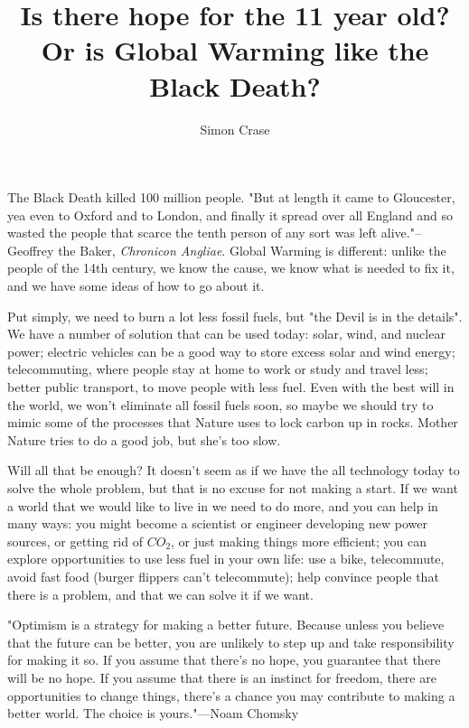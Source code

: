 \documentclass[]{article}
\title{Is there hope for the 11 year old? \\Or is Global Warming like the Black Death?}
\author{Simon Crase}
\begin{document}
\maketitle
The Black Death killed 100 million people. "But at length it came to Gloucester, yea even to Oxford and to London, and finally it spread over all England and so wasted the people that scarce the tenth person of any sort was left alive."--Geoffrey the Baker, \textit{Chronicon Angliae}. Global Warming is different: unlike the people of the 14th century, we know the cause, we know what is needed to fix it, and we have some ideas of how to go about it.


Put simply, we need to burn a lot less fossil fuels, but "the Devil is in the details". We have a number of solution that can be used today: solar, wind, and nuclear power; electric vehicles can be a good way to store excess solar and wind energy; telecommuting, where people stay at home to work or study and travel less; better public transport, to move people with less fuel. Even with the best will in the world, we won't eliminate all fossil fuels soon, so maybe we should try to mimic some of the processes that Nature uses to lock carbon up in rocks. Mother Nature tries to do a good job, but she's too slow.

Will all that be enough? It doesn't seem as if we have the all technology today to solve the whole problem, but that is no excuse for not making a start. If we want a world that we would like to live in we need to do more, and you can help in many ways: you might become a scientist or engineer developing new power sources, or getting rid of $CO_{2}$, or just making things more efficient; you can explore opportunities to use less fuel in your own life: use a bike, telecommute, avoid fast food (burger flippers can't telecommute); help convince people that there is a problem, and that we can solve it if we want.

"Optimism is a strategy for making a better future. Because unless you believe that the future can be better, you are unlikely to step up and take responsibility for making it so. If you assume that there's no hope, you guarantee that there will be no hope. If you assume that there is an instinct for freedom, there are opportunities to change things, there's a chance you may contribute to making a better world. The choice is yours."---Noam Chomsky
\end{document}
